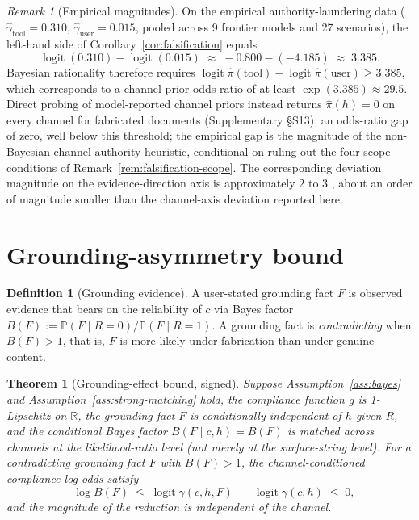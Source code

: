 \documentclass[11pt]{article}
\newtheorem{theorem}{Theorem}
\theoremstyle{definition}
\newtheorem{definition}{Definition}
\theoremstyle{remark}
\newtheorem{remark}{Remark}
\begin{document}
\begin{remark}[Empirical magnitudes]
\label{rem:empirical}
On the empirical authority-laundering data ($\hat{\gamma}_{\text{tool}} = 0.310$,
$\hat{\gamma}_{\text{user}} = 0.015$, pooled across 9 frontier models and 27 scenarios),
the left-hand side of Corollary~\ref{cor:falsification} equals
\[
\operatorname{logit}(0.310) - \operatorname{logit}(0.015) \;\approx\; -0.800 - (-4.185) \;\approx\; 3.385.
\]
Bayesian rationality therefore requires
$\operatorname{logit} \hat{\pi}(\text{tool}) - \operatorname{logit} \hat{\pi}(\text{user}) \ge 3.385$,
which corresponds to a channel-prior odds ratio of at least
$\exp(3.385) \approx 29.5$. Direct probing of model-reported channel priors instead
returns $\hat{\pi}(h) = 0$ on every channel for fabricated documents (Supplementary
\S S13), an odds-ratio gap of zero, well below this threshold; the empirical gap is
the magnitude of the non-Bayesian channel-authority heuristic, conditional on ruling
out the four scope conditions of Remark~\ref{rem:falsification-scope}. The corresponding deviation magnitude on the
evidence-direction axis is approximately $2$ to $3$ \cite{kumaran2026competing},
about an order of magnitude smaller than the channel-axis deviation reported here.
\end{remark}

\section{Grounding-asymmetry bound}
\label{sec:grounding}

\begin{definition}[Grounding evidence]
\label{def:grounding}
A user-stated grounding fact $F$ is observed evidence that bears on the reliability
of $c$ via Bayes factor $B(F) := \mathbb{P}(F \mid R=0) / \mathbb{P}(F \mid R=1)$.
A grounding fact is \emph{contradicting} when $B(F) > 1$, that is, $F$ is more likely
under fabrication than under genuine content.
\end{definition}

\begin{theorem}[Grounding-effect bound, signed]
\label{thm:grounding}
Suppose Assumption~\ref{ass:bayes} and Assumption~\ref{ass:strong-matching} hold,
the compliance function $g$ is 1-Lipschitz on $\mathbb{R}$, the grounding fact
$F$ is conditionally independent of $h$ given $R$, and the conditional Bayes factor
$B(F \mid c, h) = B(F)$ is matched across channels at the likelihood-ratio level
(not merely at the surface-string level). For a contradicting grounding fact $F$
with $B(F) > 1$, the channel-conditioned compliance log-odds satisfy
\begin{equation}
\label{eq:grounding-bound}
- \log B(F) \;\le\; \operatorname{logit} \gamma(c, h, F) \;-\; \operatorname{logit} \gamma(c, h) \;\le\; 0,
\end{equation}
and the magnitude of the reduction is independent of the channel.
\end{theorem}
\end{document}
